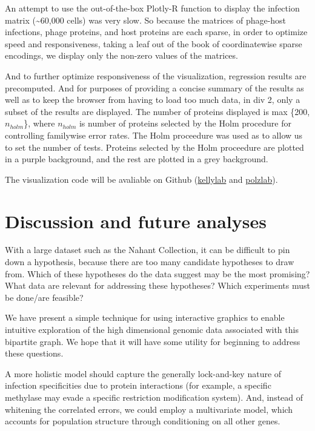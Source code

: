 \documentclass[12pt,twoside]{mitthesis-manusdown}
\begin{document}
An attempt to use the out-of-the-box Plotly-R function to display the
infection matrix (\textasciitilde{}60,000 cells) was very slow. So
because the matrices of phage-host infections, phage proteins, and host
proteins are each sparse, in order to optimize speed and responsiveness,
taking a leaf out of the book of coordinatewise sparse encodings, we
display only the non-zero values of the matrices.

And to further optimize responsiveness of the visualization, regression
results are precomputed. And for purposes of providing a concise summary
of the results as well as to keep the browser from having to load too
much data, in div 2, only a subset of the results are displayed. The
number of proteins displayed is max \{200, \(n_{holm}\)\}, where
\(n_{holm}\) is number of proteins selected by the Holm procedure for
controlling familywise error rates. The Holm proceedure was used as to
allow us to set the number of tests. Proteins selected by the Holm
proceedure are plotted in a purple background, and the rest are plotted
in a grey background.

The visualization code will be avaliable on Github
(\href{https://github.com/kellylab}{kellylab} and
\href{https://github.com/polzlab}{polzlab}).

\section{Discussion and future
analyses}\label{discussion-and-future-analyses}

With a large dataset such as the Nahant Collection, it can be difficult
to pin down a hypothesis, because there are too many candidate
hypotheses to draw from. Which of these hypotheses do the data suggest
may be the most promising? What data are relevant for addressing these
hypotheses? Which experiments must be done/are feasible?

We have present a simple technique for using interactive graphics to
enable intuitive exploration of the high dimensional genomic data
associated with this bipartite graph. We hope that it will have some
utility for beginning to address these questions.

A more holistic model should capture the generally lock-and-key nature
of infection specificities due to protein interactions (for example, a
specific methylase may evade a specific restriction modification
system). And, instead of whitening the correlated errors, we could
employ a multivariate model, which accounts for population structure
through conditioning on all other genes.
\end{document}
